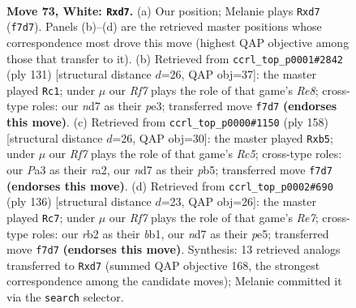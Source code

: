 \documentclass[11pt]{article}
\begin{document}
\clearpage

\begin{figure}[p]\centering
\begin{subfigure}{0.46\textwidth}\centering
\resizebox{\linewidth}{!}{%
\newchessgame
\chessboard[
  setfen={6k1/3n1RP1/8/8/p1p5/P1P4p/1r5P/6K1 w - - 1 73},
  showmover=false,
  pgfstyle=straightmove, color=movearrow, markmove={f7-d7}
]}
\caption{}
\end{subfigure}\hfill
\begin{subfigure}{0.46\textwidth}\centering
\resizebox{\linewidth}{!}{%
\newchessgame
\chessboard[
  setfen={8/3p1pk1/R4p2/5P2/6P1/4P3/5K2/4r3 b - - 14 66},
  showmover=false,
  pgfstyle=straightmove, color=movearrow, markmove={e1-c1}
]}
\caption{}
\end{subfigure}
\\[4pt]
\begin{subfigure}{0.46\textwidth}\centering
\resizebox{\linewidth}{!}{%
\newchessgame
\chessboard[
  setfen={8/8/3k4/1pR5/3p2Kp/1P1P4/r1P5/8 w - - 1 80},
  showmover=false,
  pgfstyle=straightmove, color=movearrow, markmove={c5-b5}
]}
\caption{}
\end{subfigure}\hfill
\begin{subfigure}{0.46\textwidth}\centering
\resizebox{\linewidth}{!}{%
\newchessgame
\chessboard[
  setfen={1r3k2/1P2R3/5P2/p3p3/p7/4K3/1P6/1b6 w - - 18 69},
  showmover=false,
  pgfstyle=straightmove, color=movearrow, markmove={e7-c7}
]}
\caption{}
\end{subfigure}
\caption{\textbf{Move 73, White: \texttt{Rxd7}.} (a) Our position; Melanie plays \texttt{Rxd7} (\texttt{f7d7}). Panels (b)--(d) are the retrieved master positions whose correspondence most drove this move (highest QAP objective among those that transfer to it). (b) Retrieved from \texttt{ccrl\_top\_p0001\#2842} (ply 131) [structural distance $d$=26, QAP obj=37]: the master played \texttt{Rc1}; under $\mu$ our \emph{Rf7} plays the role of that game's \emph{Re8}; cross-type roles: our \emph{n}d7 as their \emph{p}e3; transferred move \texttt{f7d7} \textbf{(endorses this move)}. (c) Retrieved from \texttt{ccrl\_top\_p0000\#1150} (ply 158) [structural distance $d$=26, QAP obj=30]: the master played \texttt{Rxb5}; under $\mu$ our \emph{Rf7} plays the role of that game's \emph{Rc5}; cross-type roles: our \emph{P}a3 as their \emph{r}a2, our \emph{n}d7 as their \emph{p}b5; transferred move \texttt{f7d7} \textbf{(endorses this move)}. (d) Retrieved from \texttt{ccrl\_top\_p0002\#690} (ply 136) [structural distance $d$=23, QAP obj=26]: the master played \texttt{Rc7}; under $\mu$ our \emph{Rf7} plays the role of that game's \emph{Re7}; cross-type roles: our \emph{r}b2 as their \emph{b}b1, our \emph{n}d7 as their \emph{p}e5; transferred move \texttt{f7d7} \textbf{(endorses this move)}. Synthesis: 13 retrieved analogs transferred to \texttt{Rxd7} (summed QAP objective 168, the strongest correspondence among the candidate moves); Melanie committed it via the \texttt{search} selector.}
\label{fig:thought-m144}
\end{figure}
\end{document}
